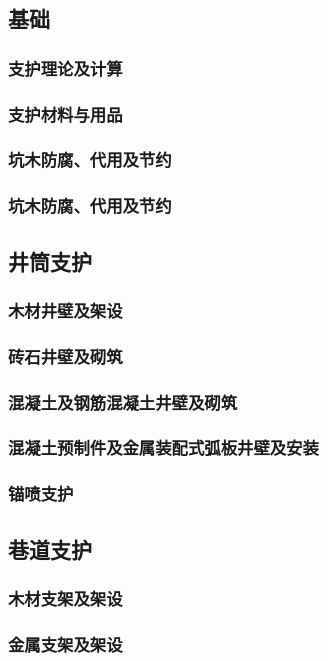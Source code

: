 \documentclass[UTF8]{../../ApplicationUniverse}
\begin{document}
    \subsection{基础}
        \subsubsection{支护理论及计算}
        \subsubsection{支护材料与用品}
        \subsubsection{坑木防腐、代用及节约}
        \subsubsection{坑木防腐、代用及节约}
    \subsection{井筒支护}
        \subsubsection{木材井壁及架设}
        \subsubsection{砖石井壁及砌筑}
        \subsubsection{混凝土及钢筋混凝土井壁及砌筑}
        \subsubsection{混凝土预制件及金属装配式弧板井壁及安装}
        \subsubsection{锚喷支护}
    \subsection{巷道支护}
        \subsubsection{木材支架及架设}
        \subsubsection{金属支架及架设}
\end{document}
